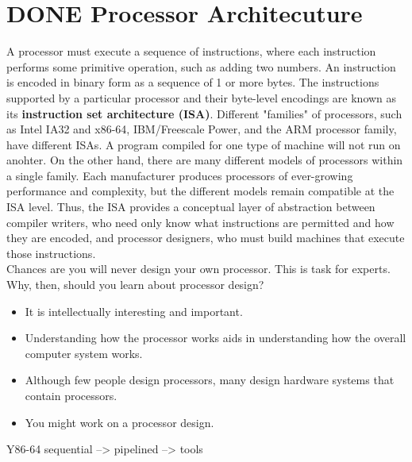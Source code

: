 \documentclass[11pt]{article}
\begin{document}
\section{{\bfseries\sffamily DONE} Processor Architecuture}
\label{sec:orgb9b727c}
A processor must execute a sequence of instructions, where each instruction performs some primitive operation, such as adding two numbers. An instruction is encoded in binary form as a sequence of 1 or more bytes. The instructions supported by a particular processor and their byte-level encodings are known as its \textbf{instruction set architecture (ISA)}. Different "families" of processors, such as Intel IA32 and x86-64, IBM/Freescale Power, and the ARM processor family, have different ISAs. A program compiled for one type of machine will not run on anohter. On the other hand, there are many different models of processors within a single family. Each manufacturer produces processors of ever-growing performance and complexity, but the different models remain compatible at the ISA level. Thus, the ISA provides a conceptual layer of abstraction between compiler writers, who need only know what instructions are permitted and how they are encoded, and processor designers, who must build machines that execute those instructions.\\


Chances are you will never design your own processor. This is task for experts. Why, then, should you learn about processor design?\\
\begin{itemize}
\item It is intellectually interesting and important.\\
\item Understanding how the processor works aids in understanding how the overall computer system works.\\
\item Although few people design processors, many design hardware systems that contain processors.\\
\item You might work on a processor design.\\
\end{itemize}


Y86-64 sequential --> pipelined --> tools\\
\end{document}

